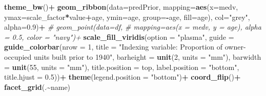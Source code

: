 \documentclass[
]{article}
\newenvironment{Shaded}{\begin{snugshade}}{\end{snugshade}}
\newcommand{\AttributeTok}[1]{\textcolor[rgb]{0.13,0.29,0.53}{#1}}
\newcommand{\CommentTok}[1]{\textcolor[rgb]{0.56,0.35,0.01}{\textit{#1}}}
\newcommand{\DecValTok}[1]{\textcolor[rgb]{0.00,0.00,0.81}{#1}}
\newcommand{\FloatTok}[1]{\textcolor[rgb]{0.00,0.00,0.81}{#1}}
\newcommand{\FunctionTok}[1]{\textcolor[rgb]{0.13,0.29,0.53}{\textbf{#1}}}
\newcommand{\NormalTok}[1]{#1}
\newcommand{\SpecialCharTok}[1]{\textcolor[rgb]{0.81,0.36,0.00}{\textbf{#1}}}
\newcommand{\StringTok}[1]{\textcolor[rgb]{0.31,0.60,0.02}{#1}}
\begin{document}
\begin{Shaded}
\begin{Highlighting}[]
  \FunctionTok{theme\_bw}\NormalTok{()}\SpecialCharTok{+}
  \FunctionTok{geom\_ribbon}\NormalTok{(}\AttributeTok{data=}\NormalTok{predPrior,}
              \AttributeTok{mapping=}\FunctionTok{aes}\NormalTok{(}\AttributeTok{x=}\NormalTok{medv, }\AttributeTok{ymax=}\NormalTok{scale\_factor}\SpecialCharTok{*}\NormalTok{value}\SpecialCharTok{+}\NormalTok{age, }
                          \AttributeTok{ymin=}\NormalTok{age, }\AttributeTok{group=}\SpecialCharTok{{-}}\NormalTok{age, }\AttributeTok{fill=}\NormalTok{age),}
              \AttributeTok{col=}\StringTok{"grey"}\NormalTok{, }\AttributeTok{alpha=}\FloatTok{0.9}\NormalTok{)}\SpecialCharTok{+}
  \CommentTok{\# geom\_point(data=df,}
  \CommentTok{\#            mapping=aes(x = medv, y = age), alpha = 0.5, color = "navy")+}
  \FunctionTok{scale\_fill\_viridis}\NormalTok{(}\AttributeTok{option =} \StringTok{"plasma"}\NormalTok{,}
                     \AttributeTok{guide =} \FunctionTok{guide\_colorbar}\NormalTok{(}\AttributeTok{nrow =} \DecValTok{1}\NormalTok{,}
                                            \AttributeTok{title =} \StringTok{"Indexing variable: }
\StringTok{                                            Proportion of owner{-}occupied units built }
\StringTok{                                            prior to 1940"}\NormalTok{,}
                                            \AttributeTok{barheight =} \FunctionTok{unit}\NormalTok{(}\DecValTok{2}\NormalTok{, }\AttributeTok{units =} \StringTok{"mm"}\NormalTok{),}
                                            \AttributeTok{barwidth =} \FunctionTok{unit}\NormalTok{(}\DecValTok{55}\NormalTok{, }\AttributeTok{units =} \StringTok{"mm"}\NormalTok{),}
                                            \AttributeTok{title.position =} \StringTok{\textquotesingle{}top\textquotesingle{}}\NormalTok{,}
                                            \AttributeTok{label.position =} \StringTok{"bottom"}\NormalTok{,}
                                            \AttributeTok{title.hjust =} \FloatTok{0.5}\NormalTok{))}\SpecialCharTok{+}
  \FunctionTok{theme}\NormalTok{(}\AttributeTok{legend.position =} \StringTok{"bottom"}\NormalTok{)}\SpecialCharTok{+}
  \FunctionTok{coord\_flip}\NormalTok{()}\SpecialCharTok{+}
  \FunctionTok{facet\_grid}\NormalTok{(.}\SpecialCharTok{\textasciitilde{}}\NormalTok{name)}
\end{Highlighting}
\end{Shaded}
\end{document}
